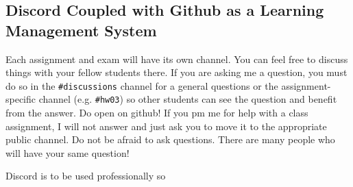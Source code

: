 \subsection*{Discord Coupled with Github as a Learning Management System}

Each assignment and exam will have its own channel. You can feel free to discuss things with your fellow students there. If you are asking me a question, you must do so in the \texttt{\#discussions} channel for a general questions or the assignment-specific channel (e.g. \texttt{\#hw03}) so other students can see the question and benefit from the answer. Do  open  on github! If you pm me for help with a class assignment, I will not answer and just ask you to move it to the appropriate public channel. Do not be afraid to ask questions. There are many people who will have your same question! 

Discord is to be used professionally so 